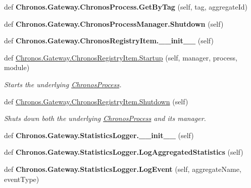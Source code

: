\begin{DoxyCompactItemize}
\item 
def {\bfseries Chronos.\+Gateway.\+Chronos\+Process.\+Get\+By\+Tag} (self, tag, aggregate\+Id)\hypertarget{group__Chronos_ga5364f8c1bdb363f9f08ace32e014fef2}{}\label{group__Chronos_ga5364f8c1bdb363f9f08ace32e014fef2}

\item 
def {\bfseries Chronos.\+Gateway.\+Chronos\+Process\+Manager.\+Shutdown} (self)\hypertarget{group__Chronos_ga43b40c699c6d13a42948beb69260dd21}{}\label{group__Chronos_ga43b40c699c6d13a42948beb69260dd21}

\item 
def {\bfseries Chronos.\+Gateway.\+Chronos\+Registry\+Item.\+\_\+\+\_\+init\+\_\+\+\_\+} (self)\hypertarget{group__Chronos_gad98bf39118bba139b9271c9301d2bea7}{}\label{group__Chronos_gad98bf39118bba139b9271c9301d2bea7}

\item 
def \hyperlink{group__Chronos_gae4d942c14fef0cc2abfc8ff9ca08eb14}{Chronos.\+Gateway.\+Chronos\+Registry\+Item.\+Startup} (self, manager, process, module)
\begin{DoxyCompactList}\small\item\em Starts the underlying \hyperlink{classChronos_1_1Gateway_1_1ChronosProcess}{Chronos\+Process}. \end{DoxyCompactList}\item 
def \hyperlink{group__Chronos_ga4094a3f48d548f9ed8c53ce14b900142}{Chronos.\+Gateway.\+Chronos\+Registry\+Item.\+Shutdown} (self)
\begin{DoxyCompactList}\small\item\em Shuts down both the underlying \hyperlink{classChronos_1_1Gateway_1_1ChronosProcess}{Chronos\+Process} and its manager. \end{DoxyCompactList}\item 
def {\bfseries Chronos.\+Gateway.\+Statistics\+Logger.\+\_\+\+\_\+init\+\_\+\+\_\+} (self)\hypertarget{group__Chronos_ga532580aa174036cc66dc5852dd102e2c}{}\label{group__Chronos_ga532580aa174036cc66dc5852dd102e2c}

\item 
def {\bfseries Chronos.\+Gateway.\+Statistics\+Logger.\+Log\+Aggregated\+Statistics} (self)\hypertarget{group__Chronos_gaa84603d1c10f4f9133e2810c92b92e05}{}\label{group__Chronos_gaa84603d1c10f4f9133e2810c92b92e05}

\item 
def {\bfseries Chronos.\+Gateway.\+Statistics\+Logger.\+Log\+Event} (self, aggregate\+Name, event\+Type)\hypertarget{group__Chronos_ga413b024e87b22352ded5c4b5c1de6a54}{}\label{group__Chronos_ga413b024e87b22352ded5c4b5c1de6a54}


\end{DoxyCompactItemize}
